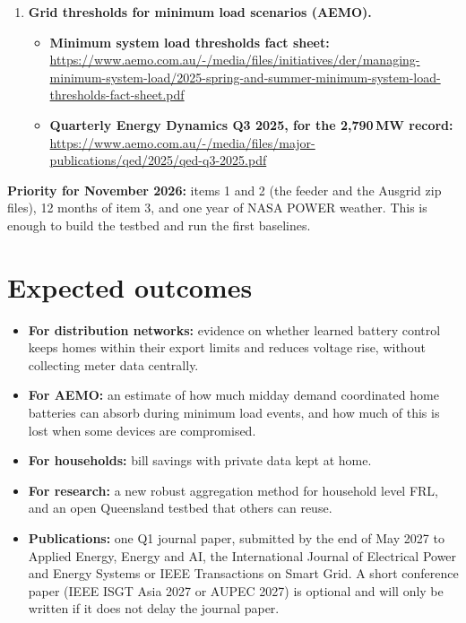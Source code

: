 \documentclass[11pt,a4paper]{article}
\begin{document}
\begin{enumerate}[leftmargin=1.6em, itemsep=6pt]
\item \textbf{Grid thresholds for minimum load scenarios (AEMO).}
\begin{itemize}
  \item \textbf{Minimum system load thresholds fact sheet:} \url{https://www.aemo.com.au/-/media/files/initiatives/der/managing-minimum-system-load/2025-spring-and-summer-minimum-system-load-thresholds-fact-sheet.pdf}~\cite{aemo_msl}
  \item \textbf{Quarterly Energy Dynamics Q3 2025, for the 2,790\,MW record:} \url{https://www.aemo.com.au/-/media/files/major-publications/qed/2025/qed-q3-2025.pdf}~\cite{aemo_q3}
\end{itemize}
\end{enumerate}

\textbf{Priority for November 2026:} items 1 and 2 (the feeder and the Ausgrid zip files), 12 months of item 3, and one year of NASA POWER weather. This is enough to build the testbed and run the first baselines.

\section{Expected outcomes}
\begin{itemize}
  \item \textbf{For distribution networks:} evidence on whether learned battery control keeps homes within their export limits and reduces voltage rise, without collecting meter data centrally.
  \item \textbf{For AEMO:} an estimate of how much midday demand coordinated home batteries can absorb during minimum load events, and how much of this is lost when some devices are compromised.
  \item \textbf{For households:} bill savings with private data kept at home.
  \item \textbf{For research:} a new robust aggregation method for household level FRL, and an open Queensland testbed that others can reuse.
  \item \textbf{Publications:} one Q1 journal paper, submitted by the end of May 2027 to Applied Energy, Energy and AI, the International Journal of Electrical Power and Energy Systems or IEEE Transactions on Smart Grid. A short conference paper (IEEE ISGT Asia 2027 or AUPEC 2027) is optional and will only be written if it does not delay the journal paper.
\end{itemize}
\end{document}
